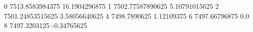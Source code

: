 0 7513.8583984375 16.1904296875
1 7502.77587890625 5.10791015625
2 7501.24853515625 3.58056640625
4 7498.7890625 1.12109375
6 7497.66796875 0.0
8 7497.3203125 -0.34765625
